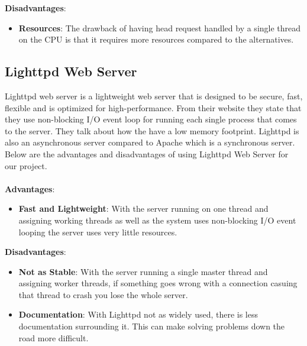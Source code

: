 	\noindent\textbf{Disadvantages}:
	\begin{itemize}
		\item \textbf{Resources}: The drawback of having head request
		handled by a single thread on the CPU is that it requires more resources
		compared to the alternatives.
	\end{itemize}

	\subsection{Lighttpd Web Server}
	Lighttpd web server is a lightweight web server that is designed to be secure,
	fast, flexible and is optimized for high-performance. From their website \cite{Lighttpd}
	they state that they use non-blocking I/O event loop for running each single
	process that comes to the server. They talk about how the have a low memory
	footprint. Lighttpd is also an asynchronous server compared to Apache which is
	a synchronous server. Below are the advantages and disadvantages of using
	Lighttpd Web Server for our project.
	\\\\
	\textbf{Advantages}:
	\begin{itemize}
		\item \textbf{Fast and Lightweight}: With the server running on one thread
		and assigning working threads as well as the system uses non-blocking I/O
		event looping the server uses very little resources.
	\end{itemize}
	\noindent\textbf{Disadvantages}:
	\begin{itemize}
		\item \textbf{Not as Stable}: With the server running a single master thread
		and assigning worker threads, if something goes wrong with a connection casuing
		that thread to crash you lose the whole server.
		\item \textbf{Documentation}: With Lighttpd not as widely used, there
		is less documentation surrounding it. This can make solving problems down the
		road more difficult.
	\end{itemize}

